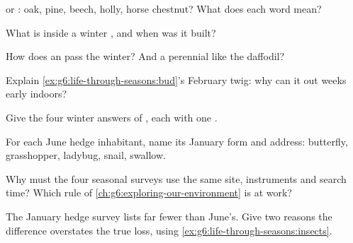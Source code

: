 \begin{exercise}[$\star$]\label{exo:g6:life-through-seasons:2}
 or : oak, pine, beech, holly, horse
chestnut? What does each word mean?
\end{exercise}

\begin{exercise}[$\star$]\label{exo:g6:life-through-seasons:3}
What is inside a winter , and when was it built?
\end{exercise}

\begin{exercise}[$\star$]\label{exo:g6:life-through-seasons:4}
How does an  pass the winter? And a perennial
like the daffodil?
\end{exercise}

\begin{exercise}[$\star$]\label{exo:g6:life-through-seasons:5}
Explain \cref{ex:g6:life-through-seasons:bud}'s February
twig: why can it  out weeks early indoors?
\end{exercise}

\begin{exercise}[$\star$]\label{exo:g6:life-through-seasons:6}
Give the four winter answers of , each with one
.
\end{exercise}

\begin{exercise}[$\star\star$]\label{exo:g6:life-through-seasons:7}
For each June hedge inhabitant, name its January form and
address: butterfly, grasshopper, ladybug, snail, swallow.
\end{exercise}

\begin{exercise}[$\star\star$]\label{exo:g6:life-through-seasons:8}
Why must the four seasonal surveys use the same site,
instruments and search time? Which rule of
\cref{ch:g6:exploring-our-environment} is at work?
\end{exercise}

\begin{exercise}[$\star\star$]\label{exo:g6:life-through-seasons:9}
The January hedge survey lists far fewer  than
June's. Give two reasons the difference overstates the true
loss, using \cref{ex:g6:life-through-seasons:insects}.
\end{exercise}

